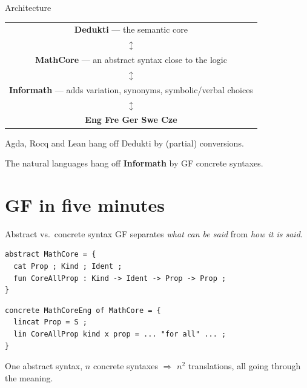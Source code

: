 \documentclass[10pt,aspectratio=169]{beamer}
\begin{document}
\begin{frame}{Architecture}
  \begin{center}
  \begin{tabular}{c}
    \textbf{Dedukti} --- the semantic core \\
    $\updownarrow$ \\
    \textbf{MathCore} --- an abstract syntax close to the logic \\
    $\updownarrow$ \\
    \textbf{Informath} --- adds variation, synonyms, symbolic/verbal choices \\
    $\updownarrow$ \\
    \textbf{Eng \quad Fre \quad Ger \quad Swe \quad \alert{Cze}} \\
  \end{tabular}
  \end{center}

  \vspace{1em}
  Agda, Rocq and Lean hang off Dedukti by (partial) conversions.

  The natural languages hang off \textbf{Informath} by GF concrete syntaxes.
\end{frame}

\section{GF in five minutes}

\begin{frame}[fragile]{Abstract vs.\ concrete syntax}
  GF separates \emph{what can be said} from \emph{how it is said}.

\begin{lstlisting}
abstract MathCore = {
  cat Prop ; Kind ; Ident ;
  fun CoreAllProp : Kind -> Ident -> Prop -> Prop ;
}
\end{lstlisting}

\begin{lstlisting}
concrete MathCoreEng of MathCore = {
  lincat Prop = S ;
  lin CoreAllProp kind x prop = ... "for all" ... ;
}
\end{lstlisting}

  \vspace{0.5em}
  One abstract syntax, $n$ concrete syntaxes $\Rightarrow$ $n^2$ translations,
  all going through the meaning.
\end{frame}
\end{document}
